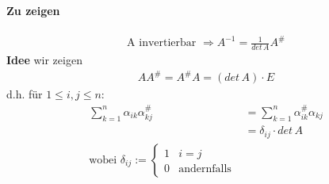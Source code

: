 \documentclass[11pt]{report}
\newcommand*\f[1] {\textbf{#1}}
\begin{document}
\paragraph{Zu zeigen}
\begin{align}
\text{A invertierbar } \Rightarrow A^{-1} = \frac{1}{det \, A} A^{\#}
\end{align}
\f{Idee} wir zeigen
\begin{align}
AA^{\#} = A^{\#}A = (det \, A) \cdot E
\end{align}
d.h. für $1 \leq i,j \leq n$:
\begin{align}
\sum_{k=1}^{n} \alpha_{ik} \alpha_{kj}^{\#} &= \sum_{k=1}^{n} \alpha_{ik}^{\#} \alpha_{kj} \\
&= \delta_{ij} \cdot det \, A \\
\text{wobei } \delta_{ij} := \left\{ \begin{matrix} 1 & i=j \\ 0 & \text{andernfalls} \end{matrix}\right.
\end{align}
\end{document}
